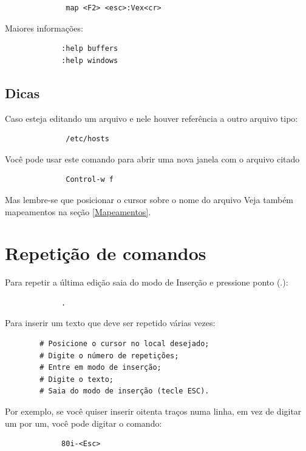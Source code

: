 \documentclass[10pt,a4paper,openany]{book}
\begin{document}
\begin{verbatim}
			  map <F2> <esc>:Vex<cr>
\end{verbatim}

Maiores informações:

\begin{verbatim}
			 :help buffers
			 :help windows
\end{verbatim}

\section{Dicas}
Caso esteja editando um arquivo e nele houver referência a outro arquivo tipo:

\begin{verbatim}
			  /etc/hosts
\end{verbatim}

Você pode usar este comando para abrir uma nova janela com o arquivo citado

\begin{verbatim}
			  Control-w f
\end{verbatim}

Mas lembre-se que posicionar o cursor sobre o nome do arquivo
Veja também mapeamentos na seção \ref{Mapeamentos}.

\chapter{Repetição de comandos}\label{Repetição de comandos}

Para repetir a última edição saia do modo de Inserção e pressione ponto (.):

\begin{verbatim}
			 .
\end{verbatim}

Para inserir um texto que deve ser repetido várias vezes:

\begin{verbatim}
		# Posicione o cursor no local desejado;
		# Digite o número de repetições;
		# Entre em modo de inserção;
		# Digite o texto;
		# Saia do modo de inserção (tecle ESC).
\end{verbatim}

Por exemplo, se você quiser inserir oitenta traços numa linha, em vez
de digitar um por um, você pode digitar o comando:

\begin{verbatim}
			 80i-<Esc>
\end{verbatim}
\end{document}
